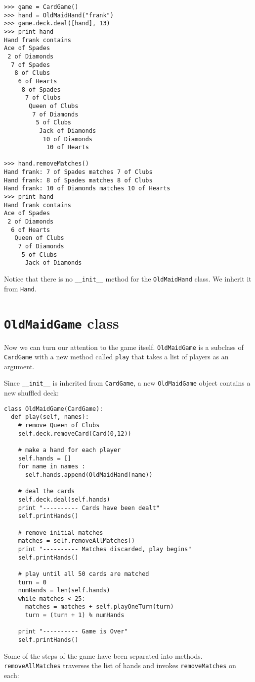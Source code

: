 \beforeverb
\begin{verbatim}
>>> game = CardGame()
>>> hand = OldMaidHand("frank")
>>> game.deck.deal([hand], 13)
>>> print hand
Hand frank contains
Ace of Spades
 2 of Diamonds
  7 of Spades
   8 of Clubs
    6 of Hearts
     8 of Spades
      7 of Clubs
       Queen of Clubs
        7 of Diamonds
         5 of Clubs
          Jack of Diamonds
           10 of Diamonds
            10 of Hearts

>>> hand.removeMatches()
Hand frank: 7 of Spades matches 7 of Clubs
Hand frank: 8 of Spades matches 8 of Clubs
Hand frank: 10 of Diamonds matches 10 of Hearts
>>> print hand
Hand frank contains
Ace of Spades
 2 of Diamonds
  6 of Hearts
   Queen of Clubs
    7 of Diamonds
     5 of Clubs
      Jack of Diamonds
\end{verbatim}
\afterverb
%
Notice that there is no {\tt \_\_init\_\_} method for the
{\tt OldMaidHand} class.  We inherit it from {\tt Hand}.


\section {{\tt OldMaidGame} class}

Now we can turn our attention to the game itself.
{\tt OldMaidGame} is a subclass of {\tt CardGame} with a new
method called {\tt play} that takes a list of players as an argument.

Since {\tt \_\_init\_\_} is inherited from {\tt CardGame},
a new {\tt OldMaidGame} object contains a new shuffled deck:


\beforeverb
\begin{verbatim}
class OldMaidGame(CardGame):
  def play(self, names):
    # remove Queen of Clubs
    self.deck.removeCard(Card(0,12))

    # make a hand for each player
    self.hands = []
    for name in names :
      self.hands.append(OldMaidHand(name))

    # deal the cards
    self.deck.deal(self.hands)
    print "---------- Cards have been dealt"
    self.printHands()

    # remove initial matches
    matches = self.removeAllMatches()
    print "---------- Matches discarded, play begins"
    self.printHands()

    # play until all 50 cards are matched
    turn = 0
    numHands = len(self.hands)
    while matches < 25:
      matches = matches + self.playOneTurn(turn)
      turn = (turn + 1) % numHands

    print "---------- Game is Over"
    self.printHands()
\end{verbatim}
\afterverb
%
Some of the steps of the game have been separated into methods.
{\tt removeAllMatches} traverses the list of hands and
invokes {\tt removeMatches} on each:

